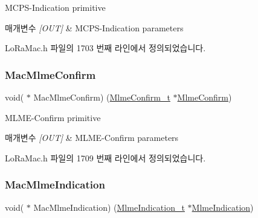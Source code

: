 M\+C\+P\+S-\/\+Indication primitive 


\begin{DoxyParams}{매개변수}
{\em \mbox{[}\+O\+U\+T\mbox{]}} & M\+C\+P\+S-\/\+Indication parameters \\
\hline
\end{DoxyParams}


Lo\+Ra\+Mac.\+h 파일의 1703 번째 라인에서 정의되었습니다.

\mbox{\label{structs_lo_ra_mac_primitives_ade47d176982e0843084c5932445898a2}} 
\subsubsection{\texorpdfstring{Mac\+Mlme\+Confirm}{MacMlmeConfirm}}
{\footnotesize\ttfamily void( $\ast$ Mac\+Mlme\+Confirm) (\mbox{\hyperlink{group___l_o_r_a_m_a_c_ga73d9d9e11e282a6c258c4d22865fe824}{Mlme\+Confirm\+\_\+t}} $\ast$\mbox{\hyperlink{lora_8c_ab72b68cc96c6187003c5dd6e325a74c7}{Mlme\+Confirm}})}



M\+L\+M\+E-\/\+Confirm primitive 


\begin{DoxyParams}{매개변수}
{\em \mbox{[}\+O\+U\+T\mbox{]}} & M\+L\+M\+E-\/\+Confirm parameters \\
\hline
\end{DoxyParams}


Lo\+Ra\+Mac.\+h 파일의 1709 번째 라인에서 정의되었습니다.

\mbox{\label{structs_lo_ra_mac_primitives_a353881c42ec9e21f3112dd548a3da87a}} 
\subsubsection{\texorpdfstring{Mac\+Mlme\+Indication}{MacMlmeIndication}}
{\footnotesize\ttfamily void( $\ast$ Mac\+Mlme\+Indication) (\mbox{\hyperlink{group___l_o_r_a_m_a_c_ga3003d863a5b49c5f3371ffa5cabb1a0b}{Mlme\+Indication\+\_\+t}} $\ast$\mbox{\hyperlink{lora_8c_ac778062b2493443f2c69391ad03e22e8}{Mlme\+Indication}})}



